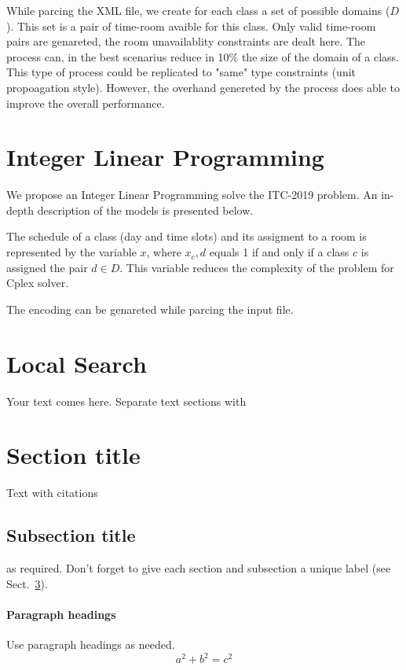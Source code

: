 \documentclass{svjour3}                     %
\begin{document}
While parcing the XML file, we create for each class a set of possible domains ($D$). This set is a pair of time-room avaible for this class. Only valid time-room pairs are genareted,  the room unavailablity constraints are dealt here. The process can, in the best scenarius reduce in 10\% the size of the domain of a class.
This type of process could be replicated to "same" type constraints (unit propoagation style). However, the overhand genereted by the process does able to improve the overall performance.

\section{Integer Linear Programming}

We propose an Integer Linear Programming solve the ITC-2019 problem. An in-depth description of the models is presented below.

The schedule of a class (day and time slots) and its assigment to a room is represented by the variable  $x$, where  $x_c,d$ equals 1 if and only if a class $c$  is assigned the pair $d \in D$. This variable reduces the complexity of the problem for Cplex solver.

The encoding can be genareted while parcing the input file.
\section{Local Search}
\label{intro}
Your text comes here. Separate text sections with
\section{Section title}
\label{sec:1}
Text with citations%
\subsection{Subsection title}
\label{sec:2}
as required. Don't forget to give each section
and subsection a unique label (see Sect.~\ref{sec:1}).
\paragraph{Paragraph headings} Use paragraph headings as needed.
\begin{equation}
a^2+b^2=c^2
\end{equation}
\end{document}
